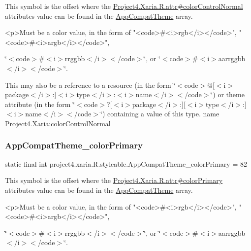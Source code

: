 This symbol is the offset where the \hyperlink{}{Project4.\+Xaria.\+R.\+attr\#color\+Control\+Normal} attribute\textquotesingle{}s value can be found in the \hyperlink{classproject4_1_1xaria_1_1R_1_1styleable_aad8bec413e2350f9404e6ff0e831a85d}{App\+Compat\+Theme} array.

\begin{DoxyVerb}      <p>Must be a color value, in the form of "<code>#<i>rgb</i></code>", "<code>#<i>argb</i></code>",
\end{DoxyVerb}
 \char`\"{}$<$code$>$\#$<$i$>$rrggbb$<$/i$>$$<$/code$>$\char`\"{}, or \char`\"{}$<$code$>$\#$<$i$>$aarrggbb$<$/i$>$$<$/code$>$\char`\"{}. 

This may also be a reference to a resource (in the form \char`\"{}$<$code$>$@\mbox{[}$<$i$>$package$<$/i$>$\+:\mbox{]}$<$i$>$type$<$/i$>$\+:$<$i$>$name$<$/i$>$$<$/code$>$\char`\"{}) or theme attribute (in the form \char`\"{}$<$code$>$?\mbox{[}$<$i$>$package$<$/i$>$\+:\mbox{]}\mbox{[}$<$i$>$type$<$/i$>$\+:\mbox{]}$<$i$>$name$<$/i$>$$<$/code$>$\char`\"{}) containing a value of this type.  name Project4.\+Xaria\+:color\+Control\+Normal \mbox{\label{classproject4_1_1xaria_1_1R_1_1styleable_a7389b87a9f3b557790bc968515833ae4}} 
\subsubsection{\texorpdfstring{App\+Compat\+Theme\+\_\+color\+Primary}{AppCompatTheme\_colorPrimary}}
{\footnotesize\ttfamily static final int project4.\+xaria.\+R.\+styleable.\+App\+Compat\+Theme\+\_\+color\+Primary = 82\hspace{0.3cm}{\ttfamily [static]}}

This symbol is the offset where the \hyperlink{}{Project4.\+Xaria.\+R.\+attr\#color\+Primary} attribute\textquotesingle{}s value can be found in the \hyperlink{classproject4_1_1xaria_1_1R_1_1styleable_aad8bec413e2350f9404e6ff0e831a85d}{App\+Compat\+Theme} array.

\begin{DoxyVerb}      <p>Must be a color value, in the form of "<code>#<i>rgb</i></code>", "<code>#<i>argb</i></code>",
\end{DoxyVerb}
 \char`\"{}$<$code$>$\#$<$i$>$rrggbb$<$/i$>$$<$/code$>$\char`\"{}, or \char`\"{}$<$code$>$\#$<$i$>$aarrggbb$<$/i$>$$<$/code$>$\char`\"{}. 

